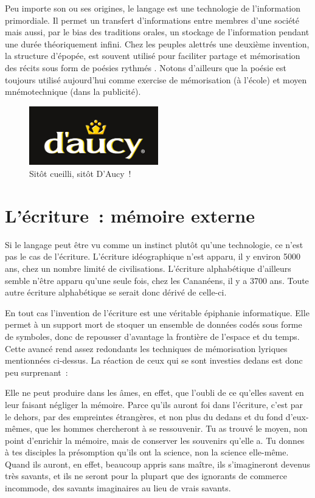 Peu importe son ou ses origines, le langage est une technologie de l'information primordiale. Il permet un transfert d'informations entre membres d'une société mais aussi, par le bias des traditions orales, un stockage de l'information pendant une durée théoriquement infini. Chez les peuples alettrés une deuxième invention, la structure d'épopée, est souvent utilisé pour faciliter partage et mémorisation des récits sous form de poésies rythmés \cite{havelock-preface-plato}. Notons d'ailleurs que la poésie est toujours utilisé aujourd'hui comme exercise de mémorisation (à l'école) et moyen mnémotechnique (dans la publicité).

\begin{figure}[H]
\centering
\includegraphics[width=0.5\textwidth]{../resources/illustrations/daucy}
\caption{\og{}Sitôt cueilli, sitôt D'Aucy~!\fg{}}
\end{figure}


\chapter{L'écriture~: mémoire externe}
Si le langage peut être vu comme un instinct plutôt qu'une technologie, ce n'est pas le cas de l'écriture. L'écriture idéographique n'est apparu, il y environ 5000 ans, chez un nombre limité de civilisations. L'écriture alphabétique d'ailleurs semble n'être apparu qu'une seule fois, chez les Cananéens, il y a 3700 ans\cite{linguistics-pinker}. Toute autre écriture alphabétique se serait donc dérivé de celle-ci.

En tout cas l'invention de l'écriture est une véritable épiphanie informatique. Elle permet à un support mort de stoquer un ensemble de données codés sous forme de symboles, donc de repousser d'avantage la frontière de l'espace et du temps.
Cette avancé rend assez redondants les techniques de mémorisation lyriques mentionnées ci-dessus. La réaction de ceux qui se sont investies dedans est donc peu surprenant~:

\begin{coolquote}
Elle ne peut produire dans les âmes, en effet, que l’oubli de ce qu’elles  savent en leur faisant négliger la mémoire. Parce qu’ils auront foi dans  l’écriture, c’est par le dehors, par des empreintes étrangères, et non plus du dedans et du fond d’eux-mêmes, que les hommes chercheront à se ressouvenir. Tu as trouvé le moyen, non point d’enrichir la mémoire, mais de conserver les souvenirs qu’elle a. Tu donnes à tes disciples la présomption qu’ils ont la science, non la science elle-même. Quand ils auront, en effet, beaucoup appris sans maître, ils s’imagineront devenus très savants, et ils ne seront pour la plupart que des ignorants de commerce incommode, des savants imaginaires au lieu de vrais savants.
\end{coolquote}

